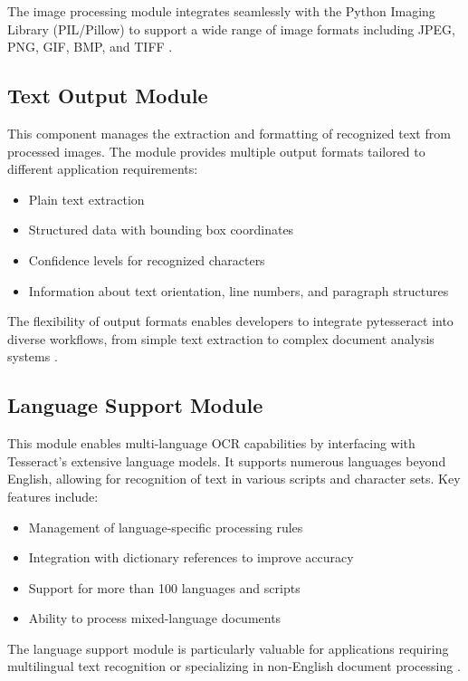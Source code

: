 The image processing module integrates seamlessly with the Python Imaging Library (PIL/Pillow) to support a wide range of image formats including JPEG, PNG, GIF, BMP, and TIFF \cite{GeekyAnts:2023}.

\subsection{Text Output Module}
\label{subsec:text_output}

This component manages the extraction and formatting of recognized text from processed images. The module provides multiple output formats tailored to different application requirements:

\begin{itemize}
	\item Plain text extraction
	\item Structured data with bounding box coordinates
	\item Confidence levels for recognized characters
	\item Information about text orientation, line numbers, and paragraph structures
\end{itemize}

The flexibility of output formats enables developers to integrate pytesseract into diverse workflows, from simple text extraction to complex document analysis systems \cite{DataCamp:2024}.

\subsection{Language Support Module}
\label{subsec:language_support}

This module enables multi-language OCR capabilities by interfacing with Tesseract's extensive language models. It supports numerous languages beyond English, allowing for recognition of text in various scripts and character sets. Key features include:

\begin{itemize}
	\item Management of language-specific processing rules
	\item Integration with dictionary references to improve accuracy
	\item Support for more than 100 languages and scripts
	\item Ability to process mixed-language documents
\end{itemize}

The language support module is particularly valuable for applications requiring multilingual text recognition or specializing in non-English document processing \cite{Anitha:2024}.


